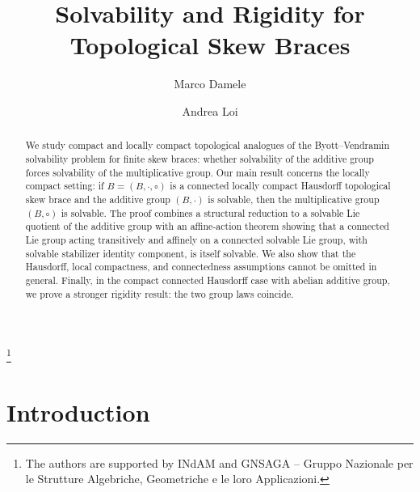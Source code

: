 \documentclass[reqno]{amsart}
\numberwithin{equation}{section}
\theoremstyle{definition}
\theoremstyle{remark}
\begin{document}
\title [Solvability and Rigidity for Topological Skew Braces]
{Solvability and Rigidity for Topological Skew Braces}


\author{Marco Damele}
\address{Dipartimento di Matematica \\
Universit\`a di Cagliari (Italy)}

\author{Andrea Loi}
\address{Dipartimento di Matematica \\
Universit\`a di Cagliari (Italy)}

\thanks{
The authors are supported by INdAM and GNSAGA -- Gruppo Nazionale per le Strutture Algebriche, Geometriche e le loro Applicazioni.}



\begin{abstract}
We study compact and locally compact topological analogues of the
Byott--Vendramin solvability problem for finite skew braces: whether
solvability of the additive group forces solvability of the multiplicative
group. Our main result concerns the locally compact setting: if
$B=(B,\cdot,\circ)$ is a connected locally compact Hausdorff topological skew
brace and the additive group $(B,\cdot)$ is solvable, then the multiplicative
group $(B,\circ)$ is solvable. 
The proof combines a structural reduction to a solvable Lie quotient of the
additive group with an affine-action theorem showing that a connected Lie group
acting transitively and affinely on a connected solvable Lie group, with
solvable stabilizer identity component, is itself solvable.
We also show that the Hausdorff, local
compactness, and connectedness assumptions cannot be omitted in general.
Finally, in the compact connected Hausdorff case with abelian additive group,
we prove a stronger rigidity result: the two group laws coincide.
\end{abstract}

\maketitle

\tableofcontents
\section{Introduction}\label{sec:introduction}
\end{document}
